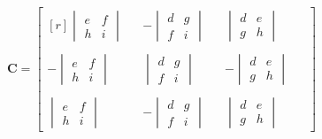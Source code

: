 \[
\mathbf C=
\begin{bmatrix*}[r]
	\begin{vmatrix}e&f\\h&i\end{vmatrix}&&-\begin{vmatrix}d&g\\f&i\end{vmatrix}&&\begin{vmatrix}d&e\\g&h\end{vmatrix}\phantom{-}\\\\
	-\begin{vmatrix}e&f\\h&i\end{vmatrix}&&\begin{vmatrix}d&g\\f&i\end{vmatrix}&&-\begin{vmatrix}d&e\\g&h\end{vmatrix}\phantom{-}\\\\
	\begin{vmatrix}e&f\\h&i\end{vmatrix}&&-\begin{vmatrix}d&g\\f&i\end{vmatrix}&&\begin{vmatrix}d&e\\g&h\end{vmatrix}\phantom{-}
\end{bmatrix*}
\]
